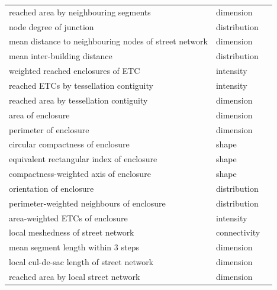 \documentclass[fleqn,10pt]{wlscirep}
\begin{document}
\begin{longtable}{lll}
                    reached area by neighbouring segments &    dimension &  \cite{fleischmann2021} \\
                                node degree of junction & distribution &       \cite{boeing2018} \\
    mean distance to neighbouring nodes of street network &    dimension &  \cite{fleischmann2021} \\
                            mean inter-building distance & distribution &       \cite{caruso2017} \\
                    weighted reached enclosures of ETC &    intensity &  \cite{fleischmann2021} \\
                reached ETCs by tessellation contiguity &    intensity &  \cite{fleischmann2021} \\
                reached area by tessellation contiguity &    dimension &  \cite{fleischmann2021} \\
                                        area of enclosure &    dimension & \cite{dibble2019origin} \\
                                perimeter of enclosure &    dimension &          \cite{gil2012} \\
                        circular compactness of enclosure &        shape &     \cite{schirmer2015} \\
                equivalent rectangular index of enclosure &        shape &    \cite{basaraner2017} \\
                compactness-weighted axis of enclosure &        shape &   \cite{feliciotti2018} \\
                                orientation of enclosure & distribution &          \cite{gil2012} \\
            perimeter-weighted neighbours of enclosure & distribution &  \cite{fleischmann2021} \\
                        area-weighted ETCs of enclosure &    intensity &  \cite{fleischmann2021} \\
                    local meshedness of street network & connectivity &   \cite{feliciotti2018} \\
                    mean segment length within 3 steps &    dimension &  \cite{fleischmann2021} \\
                local cul-de-sac length of street network &    dimension &  \cite{fleischmann2021} \\
                    reached area by local street network &    dimension &  \cite{fleischmann2021} \\

\end{longtable}
\end{document}
